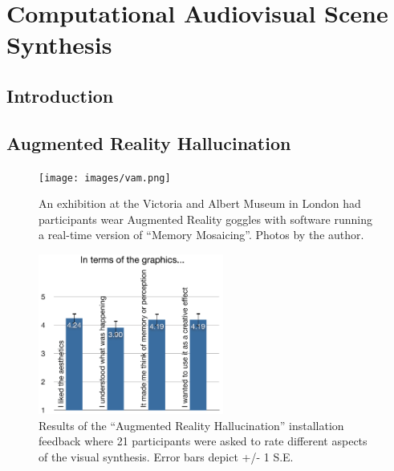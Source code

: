 \documentclass[a4paper,11pt,final]{ThesisStyle}
\newenvironment{abstract}{\rightskip1in\itshape}{}
\begin{document}

\chapter{Computational Audiovisual Scene Synthesis}
\minitoc

\begin{abstract}

\end{abstract}

\section{Introduction}

\section{Augmented Reality Hallucination}

\begin{figure}
  \centering
  \texttt{[image: images/vam.png]}
  \caption{An exhibition at the Victoria and Albert Museum in London had participants wear Augmented Reality goggles with software running a real-time version of ``Memory Mosaicing''.  Photos by the author.}
  \label{fig:vam}
\end{figure}
\begin{figure}
  \centering
  \includegraphics[width=2.4in]{images/vam-graphics-bar-resize-01.png}
  \caption{Results of the ``Augmented Reality Hallucination'' installation feedback where 21 participants were asked to rate different aspects of the visual synthesis.  Error bars depict +/- 1 S.E.}
  \label{fig:vam-graphics-bar}
\end{figure}
\end{document}

